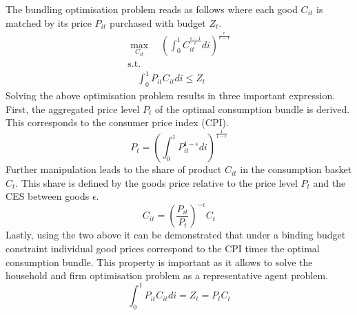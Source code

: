 \documentclass[12pt,a4paper,english]{article} %
\begin{document}
	The bundling optimisation problem reads as follows where each good $C_{it}$ is matched by its price $P_{it}$ purchased with budget $Z_t$.
	\begin{equation}
		\begin{aligned}
			\max_{C_{it}}
			\quad \left(\int_{0}^{1} C_{it}^{ \frac{\epsilon - 1}{\epsilon} } di 
			\right)^{ \frac{\epsilon}{\epsilon - 1} }\\
			\textrm{s.t.}\\
			\quad \int_{0}^{1} P_{it} C_{it} di \leq Z_t
		\end{aligned}
	\end{equation}
	Solving the above optimisation problem results in three important expression. First, the aggregated price level $P_t$ of the optimal consumption bundle is derived. This corresponds to the consumer price index (CPI).
	\begin{equation} \label{eq:1}
			P_t = \left(
						\int_{0}^{1} P_{it}^{ 1 - \epsilon } di 
					\right)^{ \frac{1}{1 - \epsilon} }
	\end{equation}
	Further manipulation leads to the share of product $C_{it}$ in the consumption basket $C_t$. This share is defined by the goods price relative to the price level $P_t$ and the CES between goods $\epsilon$.
	\begin{equation} \label{eq:cshare}
		C_{it} = \left( \frac{P_{it}}{P_t} \right)^{- \epsilon} C_t
	\end{equation}
	Lastly, using the two above it can be demonstrated that under a binding budget constraint individual good prices correspond to the CPI times the optimal consumption bundle.
	This property is important as it allows to solve the household and firm optimisation problem as a representative agent problem.
	\begin{equation}
		\int_{0}^{1} P_{it} C_{it} di = Z_t = P_t C_t
	\end{equation}
\end{document}
